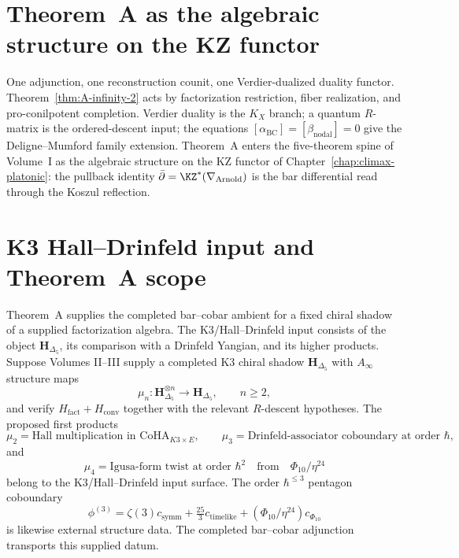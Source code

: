 \section*{Theorem~A as the algebraic structure on the KZ functor}

One adjunction, one reconstruction counit, one Verdier-dualized
duality functor.  Theorem~\ref{thm:A-infinity-2} acts by
factorization restriction, fiber realization, and pro-conilpotent
completion.  Verdier duality is the $K_X$ branch; a quantum $R$-matrix
is the ordered-descent input; the equations
$[\alpha_{\mathrm{BC}}]=[\beta_{\mathrm{nodal}}]=0$ give the
Deligne--Mumford family extension.  Theorem~A enters the
five-theorem spine of Volume~I as the algebraic structure on the KZ
functor of Chapter~\ref{chap:climax-platonic}: the pullback identity
$\bar\partial = \KZ^{*}(\nabla_{\Arnold})$ is the bar differential read
through the Koszul reflection.

\section{K3 Hall--Drinfeld input and Theorem~A scope}
\label{sec:tainf2-supplement}

\begin{remark}
\label{rem:tainf2-1}
Theorem~A supplies the completed bar--cobar ambient for a fixed chiral
shadow of a supplied factorization algebra.  The K3/Hall--Drinfeld
input consists of the object $\mathbf H_{\Delta_5}$, its comparison
with a Drinfeld Yangian, and its higher products.  Suppose Volumes
II--III supply a completed K3 chiral shadow
$\mathbf H_{\Delta_5}$ with $A_\infty$ structure maps
\[
\mu_n: \mathbf H_{\Delta_5}^{\otimes n}\to \mathbf H_{\Delta_5},\qquad n\ge 2,
\]
and verify $H_{\mathrm{fact}}+H_{\mathrm{conv}}$ together with the
relevant $R$-descent hypotheses.  The proposed first products
\[
\mu_2=\text{Hall multiplication in }\mathrm{CoHA}_{K3\times E},\qquad
\mu_3=\text{Drinfeld-associator coboundary at order }\hbar,
\]
and
\[
\mu_4=\text{Igusa-form twist at order }\hbar^2
\quad\text{from}\quad \Phi_{10}/\eta^{24}
\]
belong to the K3/Hall--Drinfeld input surface. The order
$\hbar^{\leq3}$ pentagon coboundary
\[
\phi^{(3)} = \zeta(3)c_{\mathrm{symm}}
+ \tfrac{25}{3}c_{\mathrm{timelike}}
+ (\Phi_{10}/\eta^{24})c_{\Phi_{10}}
\]
is likewise external structure data.  The completed bar--cobar
adjunction transports this supplied datum.
\end{remark}
